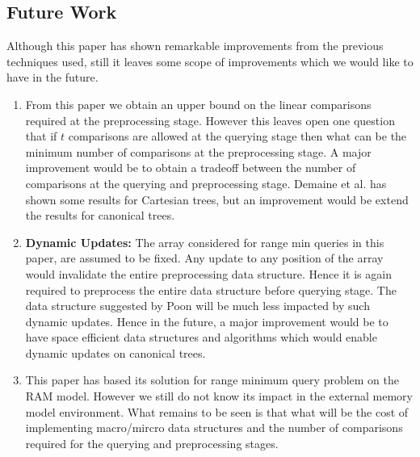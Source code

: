 \subsection*{Future Work}
Although this paper has shown remarkable improvements from the previous techniques used, still it leaves some scope of improvements which we would like to have in the future. 
\compress
\begin{enumerate} \itemsep1pt \parskip0pt 
\item From this paper we obtain an upper bound on the linear comparisons required at the preprocessing stage. However this leaves open one question that if $t$ comparisons are allowed at the querying stage then what can be the minimum number of comparisons at the preprocessing stage. A major improvement would be to obtain a tradeoff between the number of comparisons at the querying and preprocessing stage. Demaine et al. has shown some results for Cartesian trees, but an improvement would be extend the results for canonical trees.
\item \textbf{Dynamic Updates: }The array considered for range min queries in this paper, are assumed to be fixed. Any update to any position of the array would invalidate the entire preprocessing data structure. Hence it is again required to preprocess the entire data structure before querying stage. The data structure suggested by Poon \cite{p6}
will be much less impacted by such dynamic updates. Hence in the future, a major improvement would be to have space efficient data structures and algorithms which would enable dynamic updates on canonical trees.
\item This paper has based its solution for range minimum query problem on the RAM model. However we still do not know its impact in the external memory model environment. What remains to be seen is that what will be the cost of implementing macro/mircro data structures and the number of comparisons required for the querying and preprocessing stages.
\end{enumerate}
\par
